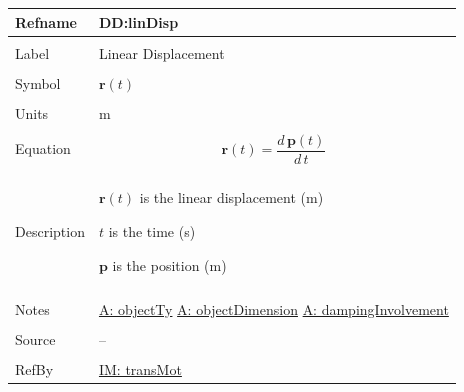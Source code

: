 \documentclass[12pt]{article}
\begin{document}
\noindent \begin{minipage}{\textwidth}
\begin{tabular}{p{} p{}}
\toprule \textbf{Refname} & \textbf{DD:linDisp}
\label{DD:linDisp}
\\ \midrule \\
Label & Linear Displacement
\\ \midrule \\
Symbol & $\mathbf{r}(t)$
\\ \midrule \\
Units & m
\\ \midrule \\
Equation & \begin{displaymath}
           \mathbf{r}(t)=\frac{d\,\mathbf{p}\left(t\right)}{d\,t}
           \end{displaymath}
\\ \midrule \\
Description & \begin{symbDescription}
              \item{$\mathbf{r}(t)$ is the linear displacement (m)}
              \item{$t$ is the time (s)}
              \item{$\mathbf{p}$ is the position (m)}
              \end{symbDescription}
\\ \midrule \\
Notes & \hyperref[assumpOT]{A: objectTy}
        \hyperref[assumpOD]{A: objectDimension}
        \hyperref[assumpDI]{A: dampingInvolvement}
\\ \midrule \\
Source & --
\\ \midrule \\
RefBy & \hyperref[IM:transMot]{IM: transMot}
\\ \bottomrule \end{tabular}
\end{minipage}
\par~
\end{document}

